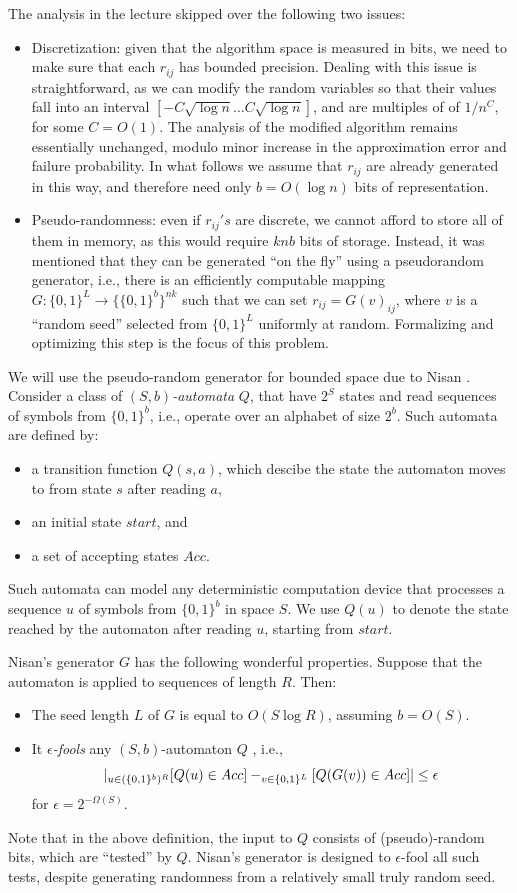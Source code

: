\documentclass[12pt]{article}
\let\Pr\relax
\DeclareMathOperator*{\Pr}{\mathbb{P}}
\begin{document}
The analysis in the lecture skipped over the following two issues:
\begin{itemize}
\item Discretization: given that the algorithm space is measured in bits, we need to make sure that each $r_{ij}$ has  bounded precision. Dealing with this issue is  straightforward, as we can modify the random variables so that their values fall into an interval $[-C \sqrt{\log n} \ldots C \sqrt{\log n} ]$, and are multiples of of $1/n^C$, for some  $C=O(1)$. The analysis of the modified algorithm remains essentially unchanged, modulo minor increase in the approximation error and failure probability. In what follows we assume that $r_{ij}$ are already generated in this way, and therefore need only $b=O(\log n)$ bits of representation. 
\item Pseudo-randomness: even if $r_{ij}'s$ are discrete, we cannot afford to store all of them in memory, as this would require $knb$ bits of storage. Instead, it was mentioned that they can be generated ``on the fly'' using a pseudorandom generator, i.e., there is an efficiently computable mapping $G:\{0,1\}^L \to \{ \{0,1\}^b \}^{nk}$ such that we can set $r_{ij}=G(v)_{ij}$, where $v$ is a ``random seed'' selected from $\{0,1\}^L$ uniformly at random.  Formalizing and optimizing this step is the focus of this problem. 
\end{itemize}


We will use the pseudo-random generator for bounded space due to Nisan \cite{Nisan92}. Consider a class of {\em $(S,b)$-automata} $Q$, that have $2^S$ states and read sequences of symbols from $\{0,1\}^b$, i.e., operate over an alphabet of size $2^b$. 
Such automata are defined by:
\begin{itemize} 
\item  a transition function $Q(s,a)$, which descibe the state the automaton moves to from state $s$ after reading $a$,
\item  an initial state $start$, and 
\item a set of accepting states $Acc$.
\end{itemize}
 Such automata can model any deterministic computation device  that processes a sequence $u$ of symbols  from $\{0,1\}^b$ in space $S$. We use $Q(u)$ to denote the state reached by the automaton  after reading $u$, starting from $start$.

Nisan's generator $G$ has the following wonderful properties. Suppose that the automaton is applied to  sequences of length $R$. Then:
\begin{itemize}
\item The seed length $L$  of $G$ is equal to $O(S \log R)$, assuming $b=O(S)$.
\item It {\em $\epsilon$-fools} any $(S,b)$-automaton $Q$  , i.e., 
\[ 
|\Pr_{u \in (\{0,1\}^b)^R} [ Q(u) \in Acc] - \Pr_{v \in \{0,1\}^L } [ Q(G(v)) \in Acc] | \le \epsilon 
\]
for $\epsilon=2^{-\Omega(S)}$.
\end{itemize}
Note that in the above definition, the input to $Q$ consists of (pseudo)-random bits, which are ``tested'' by $Q$. Nisan's generator is designed to $\epsilon$-fool all such tests, despite generating randomness from a relatively small truly random seed. 
\end{document}
